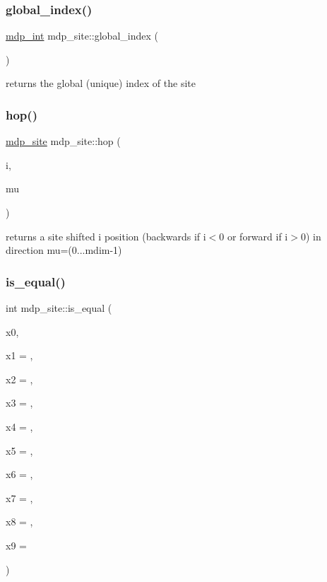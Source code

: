 \subsubsection{\texorpdfstring{global\+\_\+index()}{global\_index()}}
{\footnotesize\ttfamily \hyperlink{mdp__global__vars_8h_aaa1ad9d0dcd2124aa5af0120d9954174}{mdp\+\_\+int} mdp\+\_\+site\+::global\+\_\+index (\begin{DoxyParamCaption}{ }\end{DoxyParamCaption})\hspace{0.3cm}{\ttfamily [inline]}}



returns the global (unique) index of the site 

\mbox{\label{classmdp__site_a5982cae4c0bf2c255a978529dc6afe6c}} 
\subsubsection{\texorpdfstring{hop()}{hop()}}
{\footnotesize\ttfamily \hyperlink{classmdp__site}{mdp\+\_\+site} mdp\+\_\+site\+::hop (\begin{DoxyParamCaption}\item[{int}]{i,  }\item[{int}]{mu }\end{DoxyParamCaption})\hspace{0.3cm}{\ttfamily [inline]}}

returns a site shifted i position (backwards if i$<$0 or forward if i$>$0) in direction mu=(0...mdim-\/1) \mbox{\label{classmdp__site_a0bf9ef3d304245c68e00d7b66886f020}} 
\subsubsection{\texorpdfstring{is\+\_\+equal()}{is\_equal()}}
{\footnotesize\ttfamily int mdp\+\_\+site\+::is\+\_\+equal (\begin{DoxyParamCaption}\item[{int}]{x0,  }\item[{int}]{x1 = {},  }\item[{int}]{x2 = {},  }\item[{int}]{x3 = {},  }\item[{int}]{x4 = {},  }\item[{int}]{x5 = {},  }\item[{int}]{x6 = {},  }\item[{int}]{x7 = {},  }\item[{int}]{x8 = {},  }\item[{int}]{x9 = {} }\end{DoxyParamCaption})\hspace{0.3cm}{\ttfamily [inline]}}



